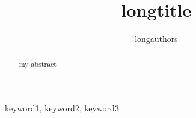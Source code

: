\documentclass[]{lni}
\begin{document}
\title[shorttitle]{longtitle}
\author[shortauthors]{longauthors}
\maketitle

\begin{keywords}
	keyword1, keyword2, keyword3
\end{keywords}

\begin{abstract}
	my abstract
\end{abstract}
\end{document}
